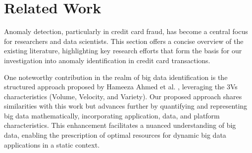 \documentclass[journal]{IEEEtran}
\begin{document}



\section{Related Work}

Anomaly detection, particularly in credit card fraud, has become a central focus for researchers and data scientists. This section offers a concise overview of the existing literature, highlighting key research efforts that form the basis for our investigation into anomaly identification in credit card transactions.

One noteworthy contribution in the realm of big data identification is the structured approach proposed by Hameeza Ahmed et al. \cite{3V}, leveraging the 3Vs characteristics (Volume, Velocity, and Variety). Our proposed approach shares similarities with this work but advances further by quantifying and representing big data mathematically, incorporating application, data, and platform characteristics. This enhancement facilitates a nuanced understanding of big data, enabling the prescription of optimal resources for dynamic big data applications in a static context.
\end{document}

